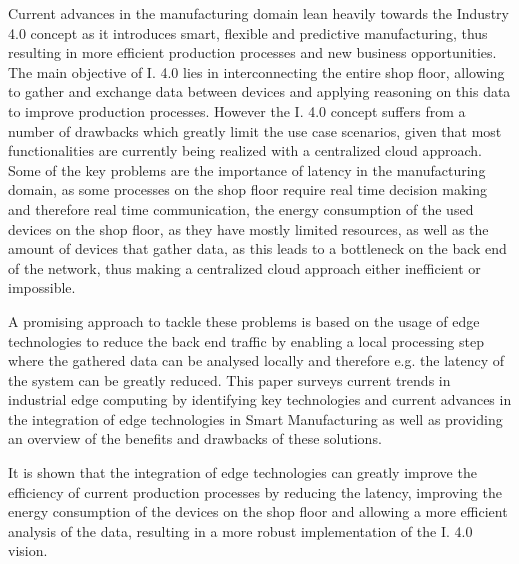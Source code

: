 Current advances in the manufacturing domain lean heavily towards the Industry 4.0 concept as it introduces smart, flexible and predictive manufacturing, thus resulting in more efficient production processes and new business opportunities. The main objective of I. 4.0 lies in interconnecting the entire shop floor, allowing to gather and exchange  data between devices and applying reasoning on this data to improve production processes. However the I. 4.0 concept suffers from a number of drawbacks which greatly limit the use case scenarios, given that most functionalities are currently being realized with a centralized cloud approach. Some of the key problems are the importance of latency in the manufacturing domain, as some processes on the shop floor require real time decision making and therefore real time communication, the energy consumption of the used devices on the shop floor, as they have mostly limited resources, as well as the amount of devices that gather data, as this leads to a bottleneck on the back end of the network, thus making a centralized cloud approach either inefficient or impossible.

A promising approach to tackle these problems is based on the usage of edge technologies to reduce the back end traffic by enabling a local processing step where the gathered data can be analysed locally and therefore e.g. the latency of the system can be greatly reduced. This paper surveys current trends in industrial edge computing by identifying key technologies and current advances in the integration of edge technologies in Smart Manufacturing as well as providing an overview of the benefits and drawbacks of these solutions.

It is shown that the integration of edge technologies can greatly improve the efficiency of current production processes by reducing the latency, improving the energy consumption of the devices on the shop floor and allowing a more efficient analysis of the data, resulting in a more robust implementation of the I. 4.0 vision.
